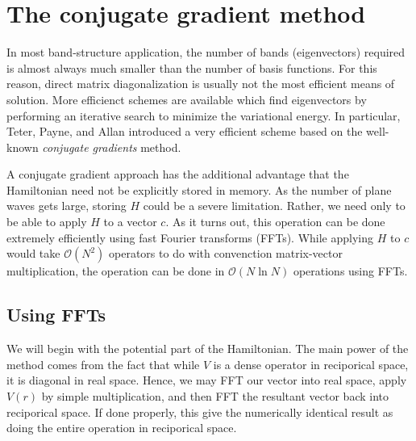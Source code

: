 \documentclass{article}
\begin{document}
\section{The conjugate gradient method}
In most band-structure application, the number of bands (eigenvectors)
required is almost always much smaller than the number of basis
functions.  For this reason, direct matrix diagonalization is usually
not the most efficient means of solution.  More efficienct schemes are
available which find eigenvectors by performing an iterative search to
minimize the variational energy. In particular, Teter, Payne, and Allan
introduced a very efficient scheme based on the well-known {\em
  conjugate gradients} method\cite{TPA}.

A conjugate gradient approach has the additional advantage that the
Hamiltonian need not be explicitly stored in memory.  As the number of
plane waves gets large, storing $H$ could be a severe limitation.
Rather, we need only to be able to apply $H$ to a vector $c$.  As it
turns out, this operation can be done extremely efficiently using fast
Fourier transforms (FFTs).  While applying $H$ to $c$ would take
$\mathcal{O}(N^2)$ operators to do with convenction matrix-vector
multiplication, the operation can be done in $\mathcal{O}(N \ln N)$
operations using FFTs.
\subsection{Using FFTs}
We will begin with the potential part of the Hamiltonian.  The main
power of the method comes from the fact that while $\hat{V}$ is a
dense operator in reciporical space, it is diagonal in real space.
Hence, we may FFT our vector into real space, apply $V(r)$ by simple
multiplication, and then FFT the resultant vector back into
reciporical space.  If done properly, this give the numerically
identical result as doing the entire operation in reciporical space.
\end{document}
